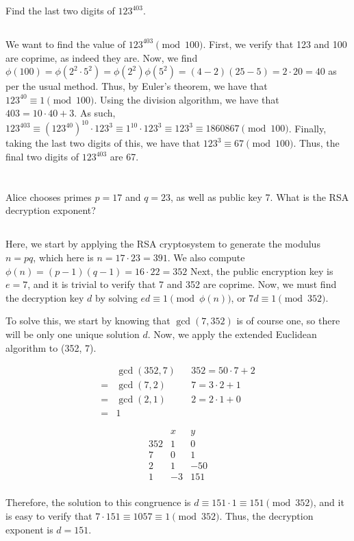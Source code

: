 \documentclass{article}
\begin{document}
Find the last two digits of $123^{403}$.

\subsection{}

We want to find the value of $123^{403} \pmod{100}$. First, we verify that 123 and 100 are coprime, as indeed they are. Now, we find $\phi(100) = \phi(2^2 \cdot 5^2) = \phi(2^2)\phi(5^2) = (4 - 2)(25 - 5) = 2 \cdot 20 = 40$ as per the usual method. Thus, by Euler's theorem, we have that $123^{40} \equiv 1 \pmod{100}$. Using the division algorithm, we have that $403 = 10 \cdot 40 + 3$. As such, $123^{403} \equiv (123^{40})^10 \cdot 123^3 \equiv 1^10 \cdot 123^3 \equiv 123^3 \equiv 1860867 \pmod{100}$. Finally, taking the last two digits of this, we have that $123^3 \equiv 67 \pmod{100}$. Thus, the final two digits of $123^{403}$ are 67.

\newpage

\section{}

Alice chooses primes $p=17$ and $q=23$, as well as public key 7. What is the RSA decryption exponent?

\subsection{}

Here, we start by applying the RSA cryptosystem to generate the modulus $n = pq$, which here is $n = 17 \cdot 23 = 391$. We also compute $\phi(n) = (p - 1)(q - 1) = 16 \cdot 22 = 352$ Next, the public encryption key is $e=7$, and it is trivial to verify that 7 and 352 are coprime. Now, we must find the decryption key $d$ by solving $ed \equiv 1 \pmod{\phi(n)}$, or $7d \equiv 1 \pmod{352}$.

To solve this, we start by knowing that $\gcd(7, 352)$ is of course one, so there will be only one unique solution $d$. Now, we apply the extended Euclidean algorithm to (352, 7).

\begin{align*}
    & \gcd(352,7) & & 352 = 50 \cdot 7 + 2 \\
    = & \gcd(7,2) & & 7 = 3 \cdot 2 + 1 \\
    = & \gcd(2, 1) & & 2 = 2 \cdot 1 + 0 \\
    = & 1
\end{align*}

$$
\begin{matrix}
  & x & y\\
352 & 1 & 0 \\
7 & 0 & 1 \\
2 & 1 & -50 \\
1 & -3 & 151 \\
\end{matrix}
$$

Therefore, the solution to this congruence is $d \equiv 151 \cdot 1 \equiv 151 \pmod{352}$, and it is easy to verify that $7 \cdot 151 \equiv 1057 \equiv 1 \pmod{352}$. Thus, the decryption exponent is $d=151$.

\newpage
\end{document}

